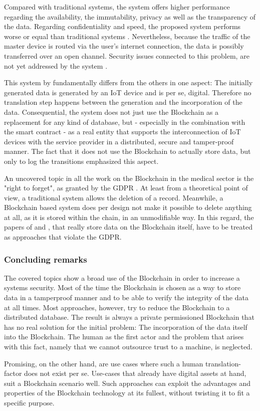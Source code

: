 Compared with traditional systems, the system offers higher performance regarding the availability, the immutability, privacy as well as the transparency of the data. Regarding confidentiality and speed, the proposed system performs worse or equal than traditional systems \cite{Baccarini2018}.
Nevertheless, because the traffic of the master device is routed via the user's internet connection, the data is possibly transferred over an open channel. Security issues connected to this problem, are not yet addressed by the system \cite{Baccarini2018}.

This system by \cite{Baccarini2018} fundamentally differs from the others in one aspect: The initially generated data is generated by an IoT device and is per se, digital. Therefore no translation step happens between the generation and the incorporation of the data.
Consequential, the system does not just use the Blockchain as a replacement for any kind of database, but - especially in the combination with the smart contract - as a real entity that supports the interconnection of IoT devices with the service provider in a distributed, secure and tamper-proof manner. The fact that it does not use the Blockchain to actually store data, but only to log the transitions emphasized this aspect.

An uncovered topic in all the work on the Blockchain in the medical sector is the "right to forget", as granted by the GDPR \cite{EuropeanCommission2017}. At least from a theoretical point of view, a traditional system allows the deletion of a record. Meanwhile, a Blockchain based system does per design not make it possible to delete anything at all, as it is stored within the chain, in an unmodifiable way. In this regard, the papers of \cite{Cao2019} and \cite{Azaria2016}, that really store data on the Blockchain itself, have to be treated as approaches that violate the GDPR.

\subsubsection{Concluding remarks}
The covered topics show a broad use of the Blockchain in order to increase a systems security. Most of the time the Blockchain is chosen as a way to store data in a tamperproof manner and to be able to verify the integrity of the data at all times.
Most approaches, however, try to reduce the Blockchain to a distributed database. The result is always a private permissioned Blockchain that has no real solution for the initial problem: The incorporation of the data itself into the Blockchain. The human as the first actor and the problem that arises with this fact, namely that we cannot outsource trust to a machine, is neglected.

Promising, on the other hand, are use cases where such a human translation-factor does not exist per se. Use-cases that already have digital assets at hand, suit a Blockchain scenario well. Such approaches can exploit the advantages and properties of the Blockchain technology at its fullest, without twisting it to fit a specific purpose.
